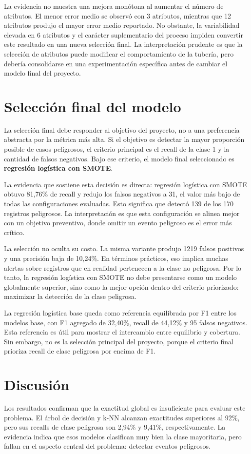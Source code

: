 \documentclass[12pt,a4paper]{article}
\begin{document}
La evidencia no muestra una mejora monótona al aumentar el número de atributos. El menor error medio se observó con 3 atributos, mientras que 12 atributos produjo el mayor error medio reportado. No obstante, la variabilidad elevada en 6 atributos y el carácter suplementario del proceso impiden convertir este resultado en una nueva selección final. La interpretación prudente es que la selección de atributos puede modificar el comportamiento de la tubería, pero debería consolidarse en una experimentación específica antes de cambiar el modelo final del proyecto.

\section{Selección final del modelo}
La selección final debe responder al objetivo del proyecto, no a una preferencia abstracta por la métrica más alta. Si el objetivo es detectar la mayor proporción posible de casos peligrosos, el criterio principal es el recall de la clase 1 y la cantidad de falsos negativos. Bajo ese criterio, el modelo final seleccionado es \textbf{regresión logística con SMOTE}.

La evidencia que sostiene esta decisión es directa: regresión logística con SMOTE obtuvo 81,76\% de recall y redujo los falsos negativos a 31, el valor más bajo de todas las configuraciones evaluadas. Esto significa que detectó 139 de los 170 registros peligrosos. La interpretación es que esta configuración se alinea mejor con un objetivo preventivo, donde omitir un evento peligroso es el error más crítico.

La selección no oculta su costo. La misma variante produjo 1219 falsos positivos y una precisión baja de 10,24\%. En términos prácticos, eso implica muchas alertas sobre registros que en realidad pertenecen a la clase no peligrosa. Por lo tanto, la regresión logística con SMOTE no debe presentarse como un modelo globalmente superior, sino como la mejor opción dentro del criterio priorizado: maximizar la detección de la clase peligrosa.

La regresión logística base queda como referencia equilibrada por F1 entre los modelos base, con F1 agregado de 32,40\%, recall de 44,12\% y 95 falsos negativos. Esta referencia es útil para mostrar el intercambio entre equilibrio y cobertura. Sin embargo, no es la selección principal del proyecto, porque el criterio final prioriza recall de clase peligrosa por encima de F1.

\section{Discusión}
Los resultados confirman que la exactitud global es insuficiente para evaluar este problema. El árbol de decisión y k-NN alcanzan exactitudes superiores al 92\%, pero sus recalls de clase peligrosa son 2,94\% y 9,41\%, respectivamente. La evidencia indica que esos modelos clasifican muy bien la clase mayoritaria, pero fallan en el aspecto central del problema: detectar eventos peligrosos.
\end{document}
